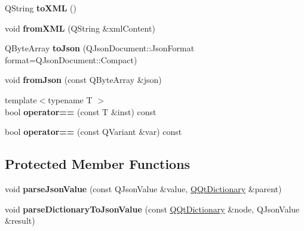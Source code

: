 \begin{DoxyCompactItemize}
Q\+String {\bfseries to\+X\+ML} ()
\item 
\mbox{\label{class_q_qt_dictionary_a67ccbbc2cf977745030f6523c19fd432}} 
void {\bfseries from\+X\+ML} (Q\+String \&xml\+Content)
\item 
\mbox{\label{class_q_qt_dictionary_a5f4ddd7ed9a89decf09edcaec39df2b0}} 
Q\+Byte\+Array {\bfseries to\+Json} (Q\+Json\+Document\+::\+Json\+Format format=Q\+Json\+Document\+::\+Compact)
\item 
\mbox{\label{class_q_qt_dictionary_a3341eb4b903d2ca235ee0d0c29e1a29e}} 
void {\bfseries from\+Json} (const Q\+Byte\+Array \&json)
\item 
\mbox{\label{class_q_qt_dictionary_a3f8421945b33ab7f10b1c6b4a768e6e4}} 
{\footnotesize template$<$typename T $>$ }\\bool {\bfseries operator==} (const T \&inst) const
\item 
\mbox{\label{class_q_qt_dictionary_af9864d0dc76fd4d7c77153843170de52}} 
bool {\bfseries operator==} (const Q\+Variant \&var) const
\end{DoxyCompactItemize}
\subsection*{Protected Member Functions}
\begin{DoxyCompactItemize}
\item 
\mbox{\label{class_q_qt_dictionary_acf17c035907e23cea768d845bd8c67c1}} 
void {\bfseries parse\+Json\+Value} (const Q\+Json\+Value \&value, \mbox{\hyperlink{class_q_qt_dictionary}{Q\+Qt\+Dictionary}} \&parent)
\item 
\mbox{\label{class_q_qt_dictionary_a735eb1778440d3c8c4cd4fbc577d2618}} 
void {\bfseries parse\+Dictionary\+To\+Json\+Value} (const \mbox{\hyperlink{class_q_qt_dictionary}{Q\+Qt\+Dictionary}} \&node, Q\+Json\+Value \&result)
\end{DoxyCompactItemize}


